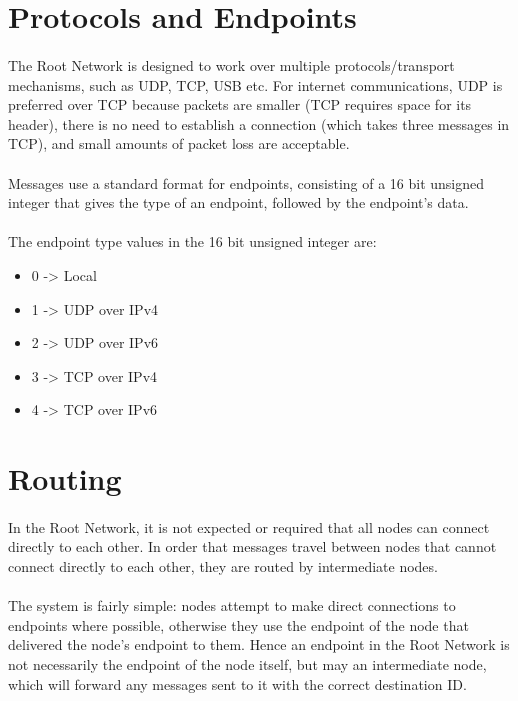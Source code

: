 \documentclass{article}
\begin{document}
\section{Protocols and Endpoints}

\paragraph{}
The Root Network is designed to work over multiple protocols/transport mechanisms, such as UDP, TCP, USB etc. For internet communications, UDP is preferred over TCP because packets are smaller (TCP requires space for its header), there is no need to establish a connection (which takes three messages in TCP), and small amounts of packet loss are acceptable.

\paragraph{}
Messages use a standard format for endpoints, consisting of a 16 bit unsigned integer that gives the type of an endpoint, followed by the endpoint's data.

\paragraph{}
The endpoint type values in the 16 bit unsigned integer are:

\begin{itemize}
\item 0 -> Local
\item 1 -> UDP over IPv4
\item 2 -> UDP over IPv6
\item 3 -> TCP over IPv4
\item 4 -> TCP over IPv6
\end{itemize}

\section{Routing}

\paragraph{}
In the Root Network, it is not expected or required that all nodes can connect directly to each other. In order that messages travel between nodes that cannot connect directly to each other, they are routed by intermediate nodes.

\paragraph{}
The system is fairly simple: nodes attempt to make direct connections to endpoints where possible, otherwise they use the endpoint of the node that delivered the node's endpoint to them. Hence an endpoint in the Root Network is not necessarily the endpoint of the node itself, but may an intermediate node, which will forward any messages sent to it with the correct destination ID.
\end{document}
